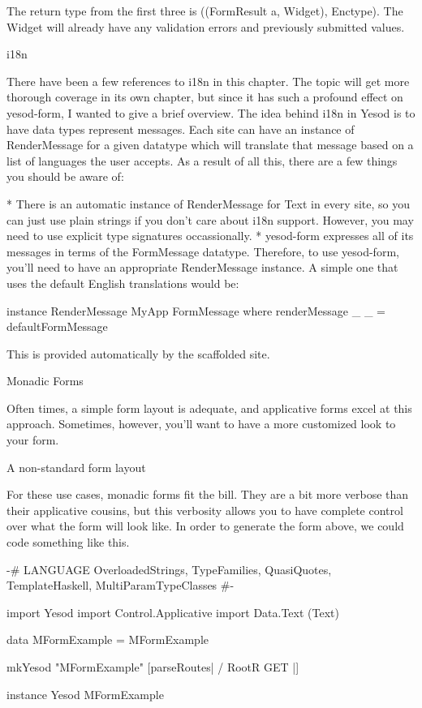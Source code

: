 The return type from the first three is ((FormResult a, Widget), Enctype). The Widget will already have any validation errors and previously submitted values.

i18n

There have been a few references to i18n in this chapter. The topic will get more thorough coverage in its own chapter, but since it has such a profound effect on yesod-form, I wanted to give a brief overview. The idea behind i18n in Yesod is to have data types represent messages. Each site can have an instance of RenderMessage for a given datatype which will translate that message based on a list of languages the user accepts. As a result of all this, there are a few things you should be aware of:

* There is an automatic instance of RenderMessage for Text in every site, so you can just use plain strings if you don't care about i18n support. However, you may need to use explicit type signatures occassionally.
* yesod-form expresses all of its messages in terms of the FormMessage datatype. Therefore, to use yesod-form, you'll need to have an appropriate RenderMessage instance. A simple one that uses the default English translations would be:

instance RenderMessage MyApp FormMessage where
    renderMessage _ _ = defaultFormMessage

This is provided automatically by the scaffolded site.

Monadic Forms

Often times, a simple form layout is adequate, and applicative forms excel at this approach. Sometimes, however, you'll want to have a more customized look to your form.

A non-standard form layout

For these use cases, monadic forms fit the bill. They are a bit more verbose than their applicative cousins, but this verbosity allows you to have complete control over what the form will look like. In order to generate the form above, we could code something like this.

{-# LANGUAGE OverloadedStrings, TypeFamilies, QuasiQuotes,
             TemplateHaskell, MultiParamTypeClasses #-}

import Yesod
import Control.Applicative
import Data.Text (Text)

data MFormExample = MFormExample

mkYesod "MFormExample" [parseRoutes|
/ RootR GET
|]

instance Yesod MFormExample

